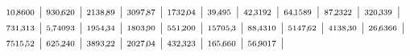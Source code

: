 \documentclass[12pt,fleqn]{article}
\theoremstyle{aufg}
\theoremstyle{bsp}
\begin{document}
\begin{flushleft}
$ \scriptstyle10,\hspace{-1pt}8600$ | $ \scriptstyle930,\hspace{-1pt}620$ | $ \scriptstyle2138,\hspace{-1pt}89$ | $ \scriptstyle3097,\hspace{-1pt}87$ | $ \scriptstyle1732,\hspace{-1pt}04$ | $ \scriptstyle39,\hspace{-1pt}495$ | $ \scriptstyle42,\hspace{-1pt}3192$ | $ \scriptstyle64,\hspace{-1pt}1589$ | $ \scriptstyle87,\hspace{-1pt}2322$ | $ \scriptstyle320,\hspace{-1pt}339$ | $ \scriptstyle731,\hspace{-1pt}313$ | $ \scriptstyle5,\hspace{-1pt}74093$ | $ \scriptstyle1954,\hspace{-1pt}34$ | $ \scriptstyle1803,\hspace{-1pt}90$ | $ \scriptstyle551,\hspace{-1pt}200$ | $ \scriptstyle15705,\hspace{-1pt}3$ | $ \scriptstyle88,\hspace{-1pt}4310$ | $ \scriptstyle5147,\hspace{-1pt}62$ | $ \scriptstyle4138,\hspace{-1pt}30$ | $ \scriptstyle26,\hspace{-1pt}6366$ | $ \scriptstyle7515,\hspace{-1pt}52$ | $ \scriptstyle625,\hspace{-1pt}240$ | $ \scriptstyle3893,\hspace{-1pt}22$ | $ \scriptstyle2027,\hspace{-1pt}04$ | $ \scriptstyle432,\hspace{-1pt}323$ | $ \scriptstyle165,\hspace{-1pt}660$ | $ \scriptstyle56,\hspace{-1pt}9017$ | \end{flushleft} 
\end{document}
